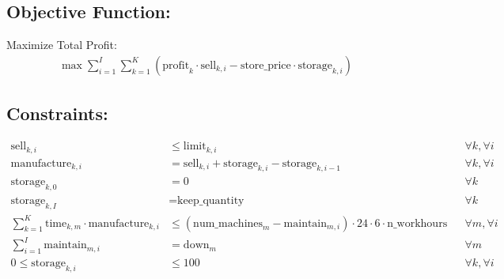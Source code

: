 \documentclass{article}
\begin{document}
\subsection*{Objective Function:}
Maximize Total Profit:
\begin{align*}
    \max \sum_{i=1}^{I} \sum_{k=1}^{K} \left( \text{profit}_k \cdot \text{sell}_{k, i} - \text{store\_price} \cdot \text{storage}_{k, i} \right)
\end{align*}

\subsection*{Constraints:}
\begin{align*}
    \text{sell}_{k, i} & \leq \text{limit}_{k, i} && \forall k, \forall i \\
    \text{manufacture}_{k, i} & = \text{sell}_{k, i} + \text{storage}_{k, i} - \text{storage}_{k, i-1} && \forall k, \forall i \\
    \text{storage}_{k, 0} & = 0 && \forall k \\
    \text{storage}_{k, I} & = \text{keep\_quantity} && \forall k \\
    \sum_{k=1}^{K} \text{time}_{k, m} \cdot \text{manufacture}_{k, i} & \leq \left( \text{num\_machines}_m - \text{maintain}_{m, i} \right) \cdot 24 \cdot 6 \cdot \text{n\_workhours} && \forall m, \forall i \\
    \sum_{i=1}^{I} \text{maintain}_{m, i} & = \text{down}_m && \forall m \\
    0 \leq \text{storage}_{k, i} & \leq 100 && \forall k, \forall i
\end{align*}
\end{document}

